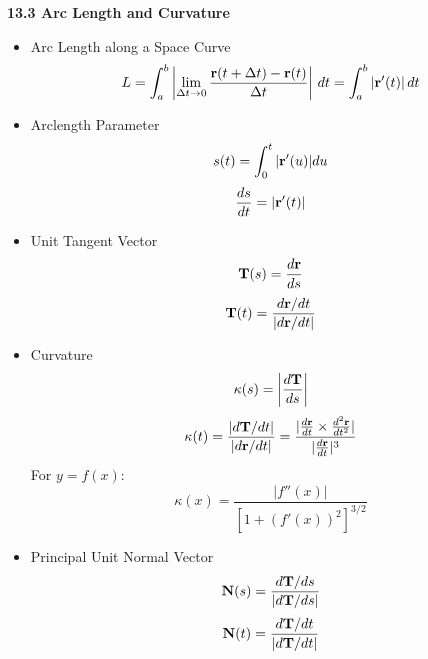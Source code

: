 \newpage

\centerline{\bf 13.3 Arc Length and Curvature}

  \begin{itemize}
    \item Arc Length along a Space Curve
          \[L = \int_a^b \left|\lim_{\Delta{t}\to0}\frac{\mathbf{r}(t+\Delta{t})-\mathbf{r}(t)}{\Delta{t}}\right| \,d{t} = \int_a^b |\mathbf{r}'(t)| \,d{t}\]

    \item Arclength Parameter 
      \[s(t) = \int_0^t |\mathbf{r}'(u)|du\]
      \[\frac{ds}{dt} = |\mathbf{r}'(t)|\]

    \item Unit Tangent Vector
      \[\mathbf{T}(s) = \frac{d\mathbf{r}}{ds}\]
      \[\mathbf{T}(t) = \frac{d\mathbf{r}/dt}{|d\mathbf{r}/dt|}\]





    \item Curvature
      \[
        \kappa(s) = \left|\frac{d\mathbf{T}}{ds}\right| 
      \]
      \[
        \kappa(t) = \frac{|d\mathbf{T}/dt|}{|d\mathbf{r}/dt|} = \frac{|\frac{d\mathbf{r}}{dt}\times \frac{d^2\mathbf{r}}{dt^2}|}{|\frac{d\mathbf{r}}{dt}|^3}
      \]
      For $y=f(x)$:
      \[
        \kappa(x) = \frac{|f''(x)|}{[1+(f'(x))^2]^{3/2}}
      \]
    
    
    
    \item Principal Unit Normal Vector
      \[\mathbf{N}(s) = \frac{d\mathbf{T}/ds}{|d\mathbf{T}/ds|}\]
      \[\mathbf{N}(t) = \frac{d\mathbf{T}/dt}{|d\mathbf{T}/dt|}\]
    

\end{itemize}
